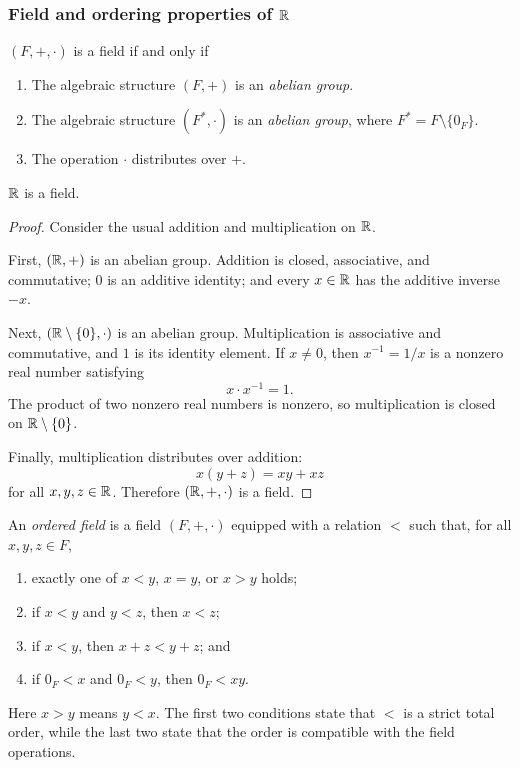 \documentclass[11pt,a4paper]{amsart}
\begin{document}
\subsubsection{Field and ordering properties of \texorpdfstring{\(\mathbb{R}\)}{R}}

\begin{definition}
  \((F, +, \cdot)\) is a field if and only if
  \begin{enumerate}
    \item The algebraic structure \((F, +)\) is an \emph{abelian group}.
    \item The algebraic structure \((F^{*}, \cdot)\) is an
      \emph{abelian group}, where \(F^{*} = F \setminus \{0_F\}\).
    \item The operation \(\cdot\) distributes over \(+\).
  \end{enumerate}
\end{definition}

\begin{theorem}
  \(\mathbb{R}\) is a field.
\end{theorem}

\begin{proof}
  Consider the usual addition and multiplication on \(\mathbb{R}\).

  First, \((\mathbb{R},+)\) is an abelian group. Addition is closed, associative,
  and commutative; \(0\) is an additive identity; and every \(x\in\mathbb{R}\) has
  the additive inverse \(-x\).

  Next, \((\mathbb{R}\setminus\{0\},\cdot)\) is an abelian group. Multiplication is
  associative and commutative, and \(1\) is its identity element. If
  \(x\neq 0\), then \(x^{-1}=1/x\) is a nonzero real number satisfying
  \[
    x\cdot x^{-1}=1.
  \]
  The product of two nonzero real numbers is nonzero, so multiplication is
  closed on \(\mathbb{R}\setminus\{0\}\).

  Finally, multiplication distributes over addition:
  \[
    x(y+z)=xy+xz
  \]
  for all \(x,y,z\in\mathbb{R}\). Therefore \((\mathbb{R},+,\cdot)\) is a field.
\end{proof}

\begin{definition}
  An \emph{ordered field} is a field \((F,+,\cdot)\) equipped with a relation
  \(<\) such that, for all \(x,y,z\in F\),
  \begin{enumerate}
    \item exactly one of \(x<y\), \(x=y\), or \(x>y\) holds;
    \item if \(x<y\) and \(y<z\), then \(x<z\);
    \item if \(x<y\), then \(x+z<y+z\); and
    \item if \(0_F<x\) and \(0_F<y\), then \(0_F<xy\).
  \end{enumerate}
  Here \(x>y\) means \(y<x\). The first two conditions state that \(<\) is a
  strict total order, while the last two state that the order is compatible
  with the field operations.
\end{definition}
\end{document}
